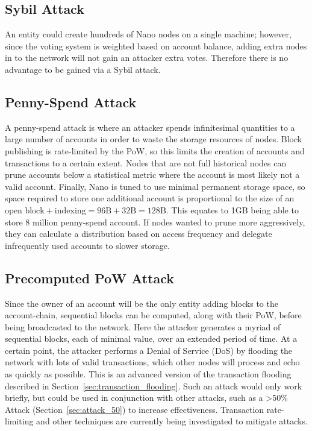\subsection{Sybil Attack}
An entity could create hundreds of Nano nodes on a single machine; however, since the voting system is weighted based on account balance, adding extra nodes in to the network will not gain an attacker extra votes. Therefore there is no advantage to be gained via a Sybil attack.

\subsection{Penny-Spend Attack}
A penny-spend attack is where an attacker spends infinitesimal quantities to a large number of accounts in order to waste the storage resources of nodes. Block publishing is rate-limited by the PoW, so this limits the creation of accounts and transactions to a certain extent. Nodes that are not full historical nodes can prune accounts below a statistical metric where the account is most likely not a valid account. Finally, Nano is tuned to use minimal permanent storage space, so space required to store one additional account is proportional to the size of an $\text{open block} + \text{indexing} = 96\text{B} + 32\text{B} = 128\text{B}$. This equates to 1GB being able to store 8 million penny-spend account. If nodes wanted to prune more aggressively, they can calculate a distribution based on access frequency and delegate infrequently used accounts to slower storage.

\subsection{Precomputed PoW Attack}
Since the owner of an account will be the only entity adding blocks to the account-chain, sequential blocks can be computed, along with their PoW, before being broadcasted to the network. Here the attacker generates a myriad of sequential blocks, each of minimal value, over an extended period of time. At a certain point, the attacker performs a Denial of Service (DoS) by flooding the network with lots of valid transactions, which other nodes will process and echo as quickly as possible. This is an advanced version of the transaction flooding described in Section~\ref{sec:transaction_flooding}. Such an attack would only work briefly, but could be used in conjunction with other attacks, such as a \textgreater 50\% Attack (Section~\ref{sec:attack_50}) to increase effectiveness. Transaction rate-limiting and other techniques are currently being investigated to mitigate attacks.

